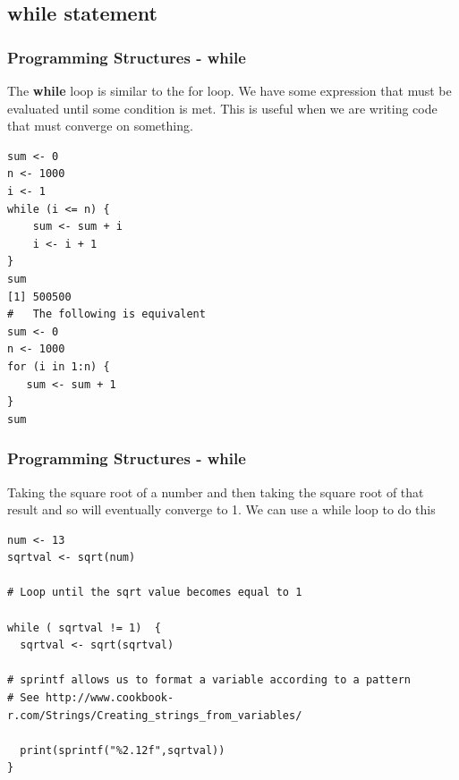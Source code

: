 \documentclass{beamer}
\begin{document}
%

\subsection{while statement}
\begin{frame}[fragile]
\frametitle{Programming Structures - while}
The \textbf{while} loop is similar to the for loop. We have some expression that must be evaluated until some condition is met. This is useful when we are writing code that must converge on something.  
\footnotesize
\begin{verbatim}
sum <- 0 
n <- 1000
i <- 1
while (i <= n) {
    sum <- sum + i
    i <- i + 1
}
sum
[1] 500500
#   The following is equivalent
sum <- 0
n <- 1000
for (i in 1:n) {
   sum <- sum + 1
}
sum
\end{verbatim}
\end{frame}


%

\begin{frame}[fragile]
\frametitle{Programming Structures - while }
Taking the square root of a number and then taking the square root of that result and so will
eventually converge to 1. We can use a while loop to do this
\footnotesize
\begin{verbatim}
num <- 13
sqrtval <- sqrt(num)

# Loop until the sqrt value becomes equal to 1

while ( sqrtval != 1)  {    
  sqrtval <- sqrt(sqrtval)

# sprintf allows us to format a variable according to a pattern
# See http://www.cookbook-r.com/Strings/Creating_strings_from_variables/

  print(sprintf("%2.12f",sqrtval))
}
\end{verbatim}
\end{frame}
\end{document}
